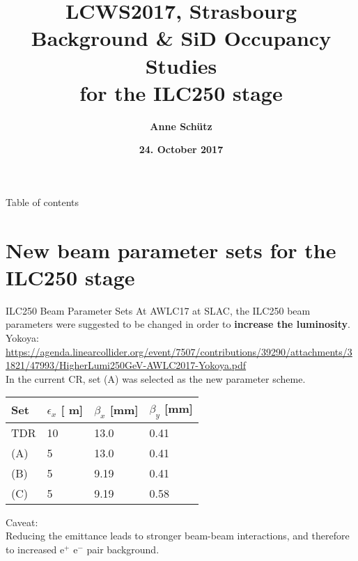 \documentclass[xcolor={dvipsnames}]{beamer}
\title[ILC250 backgrounds \& SiD Occupancy]{\textbf{\alert{LCWS2017, Strasbourg} \\ \vspace*{0.5cm}  Background \& SiD Occupancy Studies\\for the ILC250 stage}}
\author{\textbf{Anne Sch\"utz}}
\institute{\textbf{DESY}}
\date{\textbf{24. October 2017}}
\newcommand{\electron}{e$^-$\xspace}
\newcommand{\positron}{e$^+$\xspace}
\newcommand{\murm}{%
  \ifmmode
    \mathchoice
        {\hbox{\normalsize\textmu}}
        {\hbox{\normalsize\textmu}}
        {\hbox{\scriptsize\textmu}}
        {\hbox{\tiny\textmu}}%
  \else
    \textmu
  \fi
}
\begin{document}
{
\begin{frame}
  \titlepage
\end{frame}
}
\setcounter{tocdepth}{2}
\begin{frame}{Table of contents}
  \tableofcontents
\end{frame}


\section{New beam parameter sets for the ILC250 stage}

\begin{frame}{ILC250 Beam Parameter Sets}
At AWLC17 at SLAC, the ILC250 beam parameters were suggested to be changed in order to \textbf{increase the luminosity}.\\
{\small Yokoya: \url{https://agenda.linearcollider.org/event/7507/contributions/39290/attachments/31821/47993/HigherLumi250GeV-AWLC2017-Yokoya.pdf}}\\
In the current CR, set (A) was selected as the new parameter scheme.
 \begin{table}
\label{tab:Parameters}
\centering
\begin{tabularx}{0.55\textwidth}{llll}
\hline\hline
\textbf{Set}  & \textbf{$\epsilon_x$ [\murm m]} & \textbf{$\beta_x$ [mm]} & \textbf{$\beta_y$ [mm]}\\
\hline
\cline{1-4}
\hline
 TDR & 10 & 13.0 & 0.41\\
 \alert{(A)} & 5 & 13.0 & 0.41\\
 (B) & 5 & 9.19 & 0.41\\
 (C) & 5 & 9.19 & 0.58\\
\hline\hline
\end{tabularx}
\end{table}
\alert{Caveat:\\
Reducing the emittance leads to stronger beam-beam interactions, and therefore to increased \positron \electron pair background.}
\end{frame}
\end{document}
